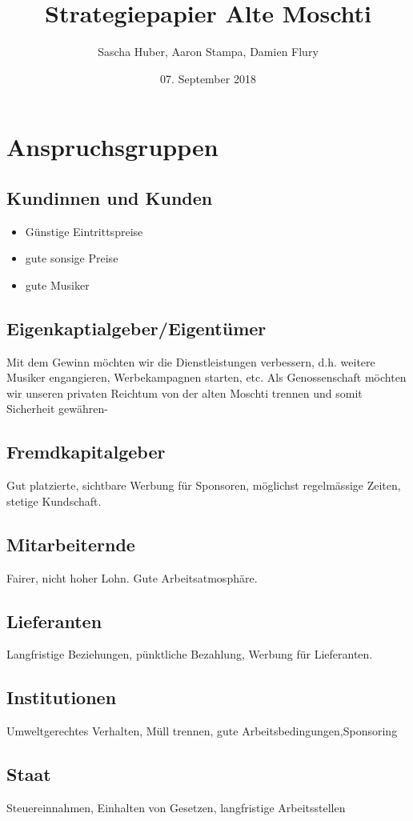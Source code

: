 \documentclass[a4paper, titlepage]{article}
\title{Strategiepapier Alte Moschti}
\author{Sascha Huber, Aaron Stampa, Damien Flury}
\date{07. September 2018}
\begin{document}
\maketitle

\tableofcontents
\newpage

\section{Anspruchsgruppen}
\subsection{Kundinnen und Kunden}
\begin{itemize}
  \item Günstige Eintrittspreise
  \item gute sonsige Preise
  \item gute Musiker
\end{itemize}
\subsection{Eigenkaptialgeber/Eigentümer}
Mit dem Gewinn möchten wir die Dienstleistungen verbessern, d.h. weitere Musiker engangieren,
Werbekampagnen starten, etc. Als Genossenschaft möchten wir unseren privaten Reichtum von der
alten Moschti trennen und somit Sicherheit gewähren-
\subsection{Fremdkapitalgeber}
Gut platzierte, sichtbare Werbung für Sponsoren, möglichst regelmässige Zeiten, stetige Kundschaft.
\subsection{Mitarbeiternde}
Fairer, nicht hoher Lohn. Gute Arbeitsatmosphäre.
\subsection{Lieferanten}
Langfristige Beziehungen, pünktliche Bezahlung, Werbung für Lieferanten.
\subsection{Institutionen}
Umweltgerechtes Verhalten, Müll trennen, gute Arbeitsbedingungen,Sponsoring
\subsection{Staat}
Steuereinnahmen, Einhalten von Gesetzen, langfristige Arbeitsstellen
\end{document}
